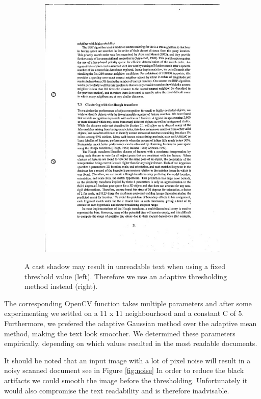 \documentclass[bibliography=totoc]{scrartcl}
\begin{document}
\begin{figure}[h!]
\begin{subfigure}[b]{0.3\linewidth}
		\includegraphics[width=\linewidth]{imgs/threshold/bad_lighting_adaptive.jpg}
	\end{subfigure}
	\caption{A cast shadow may result in unreadable text when using a fixed threshold value (left). Therefore we use an adaptive thresholding method instead (right).}
	\label{fig:thresholding}
\end{figure}


The corresponding OpenCV function takes multiple parameters and after some experimenting we settled on a 11 x 11 neighbourhood and a constant C of 5.
Furthermore, we prefered the adaptive Gaussian method over the adaptive mean method, making the text look smoother.
We determined these parameters empirically, depending on which values resulted in the most readable documents.

It should be noted that an input image with a lot of pixel noise will result in a noisy scanned document see in Figure \ref{fig:noise}
In order to reduce the black artifacts we could smooth the image before the thresholding.
Unfortunately it would also compromise the text readability and is therefore inadvisable. \\
\end{document}
